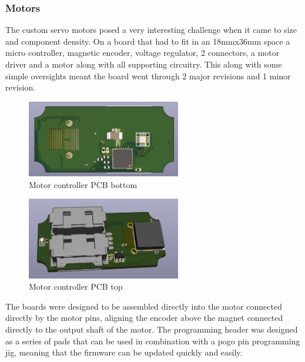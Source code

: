 \subsubsection{Motors}
The custom servo motors posed a very interesting challenge when it came to size and component density. On a board that had to fit in an 18mmx36mm space a micro controller, magnetic encoder, voltage regulator, 2 connectors, a motor driver and a motor along with all supporting circuitry. This along with some simple oversights meant the board went through 2 major revisions and 1 minor revision. 

\begin{figure}[H]
       \centering
       \includegraphics[width=0.6\textwidth]{figures/MotorControllerBottom.png}
       \caption{Motor controller PCB bottom}
       \label{fig:MotortControllerPCBBottom}
   \end{figure}
   \begin{figure}[H]
       \centering
       \includegraphics[width=0.6\textwidth]{figures/MotorControllerTop.png}
       \caption{Motor controller PCB top}
       \label{fig:MotorControllerPCBTop}
   \end{figure}
The boards were designed to be assembled directly into the motor connected directly by the motor pins, aligning the encoder above the magnet connected directly to the output shaft of the motor. The programming header was designed as a series of pads that can be used in combination with a pogo pin programming jig, meaning that the firmware can be updated quickly and easily. 
